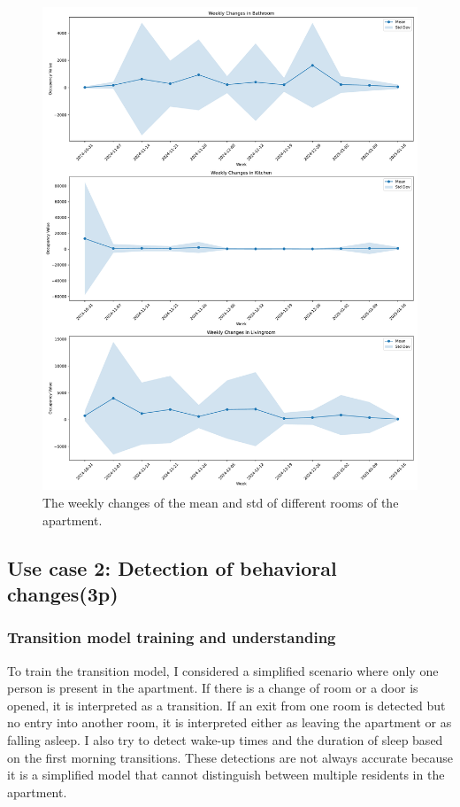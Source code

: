 \documentclass[A4,10pt]{article}
\begin{document}
\begin{figure}[H]
	\centering
	\includegraphics[width=1.15\textwidth]{weekly_changes.pdf}
	\caption{The weekly changes of the mean and std of different rooms of the apartment.}
	\label{fig:detected_emergencies}
\end{figure}

\subsection{ Use case 2: Detection of behavioral changes(3p)}

\subsubsection{Transition model training and understanding}

To train the transition model, I considered a simplified scenario where only one person is present in the apartment. If there is a change of room or a door is opened, it is interpreted as a transition. If an exit from one room is detected but no entry into another room, it is interpreted either as leaving the apartment or as falling asleep. I also try to detect wake-up times and the duration of sleep based on the first morning transitions. These detections are not always accurate because it is a simplified model that cannot distinguish between multiple residents in the apartment.
\end{document}
